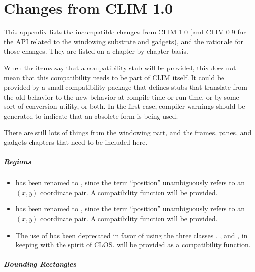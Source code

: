 
\chapter {Changes from CLIM 1.0}
\label {changes}

This appendix lists the incompatible changes from CLIM 1.0 (and CLIM 0.9 for the
API related to the windowing substrate and gadgets), and the rationale for those
changes.  They are listed on a chapter-by-chapter basis.

When the items say that a compatibility stub will be provided, this does not
mean that this compatibility needs to be part of CLIM itself.  It could be
provided by a small compatibility package that defines stubs that translate from
the old behavior to the new behavior at compile-time or run-time, or by some
sort of conversion utility, or both.  In the first case, compiler warnings
should be generated to indicate that an obsolete form is being used.

 {There are still lots of things from the windowing part, and the
frames, panes, and gadgets chapters that need to be included here.}

\paragraph {Regions}

\begin{itemize}
\item {} has been renamed to , since the
term ``position'' unambiguously refers to an $(x,y)$ coordinate pair.  A
compatibility function will be provided.

\item {} has been renamed to
, since the term ``position'' unambiguously
refers to an $(x,y)$ coordinate pair.  A compatibility function will be
provided.

\item The use of  has been deprecated in favor of using
the three classes , ,
and , in keeping with the spirit of CLOS.
 will be provided as a compatibility function.
\end{itemize}


\paragraph {Bounding Rectangles}

